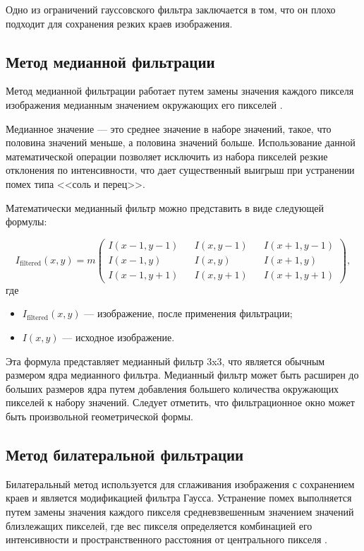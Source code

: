 Одно из ограничений гауссовского фильтра заключается в том, что он плохо подходит для сохранения резких краев изображения.

\subsection{Метод медианной фильтрации}

Метод медианной фильтрации работает путем замены значения каждого пикселя изображения медианным значением окружающих его пикселей \cite{medianfilter}. 

Медианное значение --- это среднее значение в наборе значений, такое, что половина значений меньше, а половина значений больше. Использование данной математической операции позволяет исключить из набора пикселей резкие отклонения по интенсивности, что дает существенный выигрыш при устранении помех типа <<соль и перец>>.

Математически медианный фильтр можно представить в виде следующей формулы:

\begin{equation}
    I_{\text{filtered}}(x,y) = m   \begin{pmatrix}
I(x-1,y-1) && I(x,y-1) && I(x+1,y-1) \\
I(x-1,y) && I(x,y) && I(x+1,y) \\
I(x-1,y+1) && I(x,y+1) && I(x+1,y+1)
\end{pmatrix},
\end{equation}
где
\begin{itemize}
    \item $I_{\text{filtered}}(x,y)$ --- изображение, после применения фильтрации;
    \item $I(x,y)$ --- исходное изображение.
\end{itemize}

Эта формула представляет медианный фильтр 3x3, что является обычным размером ядра медианного фильтра. Медианный фильтр может быть расширен до больших размеров ядра путем добавления большего количества окружающих пикселей к набору значений. Следует отметить, что фильтрационное окно может быть произвольной геометрической формы.

\subsection{Метод билатеральной фильтрации}

Билатеральный метод используется для сглаживания изображения с сохранением краев и является модификацией фильтра Гаусса. Устранение помех выполняется путем замены значения каждого пикселя средневзвешенным значением значений близлежащих пикселей, где вес пикселя определяется комбинацией его интенсивности и пространственного расстояния от центрального пикселя \cite{bilateralfilter}.


